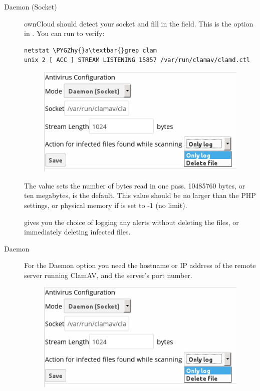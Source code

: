 \documentclass[letterpaper,10pt,english]{sphinxmanual}
\def\PYGZhy{\char`\-}
\begin{document}
\begin{description}
\item[{Daemon (Socket)}] \leavevmode
ownCloud should detect your  socket and fill in the 
field. This is the  option in . You can
run  to verify:

\begin{Verbatim}[commandchars=\\\{\}]
netstat \PYGZhy{}a\textbar{}grep clam
unix 2 [ ACC ] STREAM LISTENING 15857 /var/run/clamav/clamd.ctl
\end{Verbatim}
\begin{figure}[htbp]
\centering

\includegraphics{antivirus-daemon-socket.png}
\end{figure}

The  value sets the number of bytes read in one pass.
10485760 bytes, or ten megabytes, is the default. This value should be
no larger than the PHP  settings, or physical memory if
 is set to -1 (no limit).

 gives you the choice of
logging any alerts without deleting the files, or immediately deleting
infected files.

\item[{Daemon}] \leavevmode
For the Daemon option you need the hostname or IP address of the remote
server running ClamAV, and the server's port number.
\begin{figure}[htbp]
\centering

\includegraphics{antivirus-daemon-socket.png}
\end{figure}


\end{description}
\end{document}
